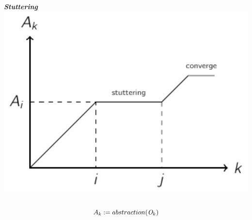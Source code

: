 \documentclass[aspectratio=169]{beamer}
\begin{document}
\begin{frame}
\begin{block}{}
\begin{columns}
\begin{column}{0.45\textwidth}
        \begin{center}{\scriptsize \textbf{\textit{Stuttering}}}
          \includegraphics[width=1\textwidth]{figures/stuttering}
        \end{center}
      \end{column}
    \end{columns}
    \[
      A_k := abstraction(\observation[k])
      \]
  \end{block}
\end{frame}
\end{document}
